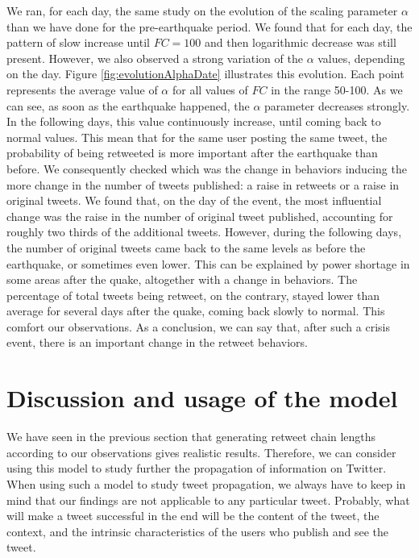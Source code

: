 \documentclass[conference]{IEEEtran}
\begin{document}
We ran, for each day, the same study on the evolution of the scaling parameter $\alpha$ than we have done for the pre-earthquake period. We found that for each day, the pattern of slow increase until $FC=100$ and then logarithmic decrease was still present. However, we also observed a strong variation of the $\alpha$ values, depending on the day. Figure \ref{fig:evolutionAlphaDate} illustrates this evolution. Each point represents the average value of $\alpha$ for all values of $FC$ in the range 50-100. As we can see, as soon as the earthquake happened, the $\alpha$ parameter decreases strongly. In the following days, this value continuously increase, until coming back to normal values. This mean that for the same user posting the same tweet, the probability of being retweeted is more important after the earthquake than before.
We consequently checked which was the change in behaviors inducing  the more change in the number of tweets published: a raise in retweets or a raise in original tweets. We found that, on the day of the event, the most influential change was the raise in the number of original tweet published, accounting for roughly two thirds of the additional tweets. However, during the following days, the number of original tweets came back to the same levels as before the earthquake, or sometimes even lower. This can be explained by power shortage in some areas after the quake, altogether with a change in behaviors. The percentage of total tweets being retweet, on the contrary, stayed lower than average for several days after the quake, coming back slowly to normal. This comfort our observations. As a conclusion, we can say that, after such a crisis event, there is an important change in the retweet behaviors.

\section{Discussion and usage of the model}
We have seen in the previous section that generating retweet chain lengths according to our observations gives realistic results. Therefore, we can consider using this model to study further the propagation of information on Twitter. When using such a model to study tweet propagation, we always have to keep in mind that our findings are not applicable to any particular tweet. Probably, what will make a tweet successful in the end will be the content of the tweet, the context, and the intrinsic characteristics of the users who publish and see the tweet.
\end{document}
